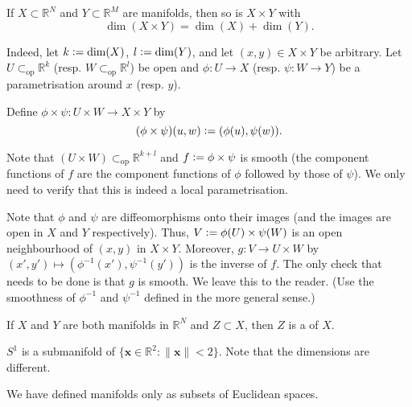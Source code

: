 \documentclass[12pt]{article}
\newcommand{\opsub}{\subset_{\operatorname{op}}}
\begin{document}
\begin{ex}
	If $X \subset \mathbb{R}^{N}$ and $Y \subset \mathbb{R}^{M}$ are manifolds, then so is $X \times Y$ with
	\begin{equation*} 
		\boxed{\dim(X \times Y) = \dim(X) + \dim(Y).}
	\end{equation*}

	Indeed, let $k \vcentcolon= \dim(X)$, $l \vcentcolon= \dim(Y)$, and let $(x, y) \in X \times Y$ be arbitrary. Let $U \opsub \mathbb{R}^{k}$ (resp. $W \opsub \mathbb{R}^{l}$) be open and $\phi : U \to X$ (resp. $\psi : W \to Y$) be a parametrisation around $x$ (resp. $y$). 

	Define $\phi \times \psi : U \times W \to X \times Y$ by
	\begin{equation*} 
		(\phi \times \psi)(u, w) \vcentcolon= (\phi(u), \psi(w)).
	\end{equation*}

	Note that $(U \times W) \opsub \mathbb{R}^{k + l}$ and $f \vcentcolon= \phi \times \psi$ is smooth (the component functions of $f$ are the component functions of $\phi$ followed by those of $\psi$). We only need to verify that this is indeed a local parametrisation.

	Note that $\phi$ and $\psi$ are diffeomorphisms onto their images (and the images are open in $X$ and $Y$ respectively). Thus, $V \vcentcolon= \phi(U) \times \psi(W)$ is an open neighbourhood of $(x, y)$ in $X \times Y$. Moreover, $g : V \to U \times W$ by $(x', y') \mapsto (\phi^{-1}(x'), \psi^{-1}(y'))$ is the inverse of $f$. \newline
	The only check that needs to be done is that $g$ is smooth. We leave this to the reader. (Use the smoothness of $\phi^{-1}$ and $\psi^{-1}$ defined in the more general sense.)
\end{ex}

\begin{defn}
	If $X$ and $Y$ are both manifolds in $\mathbb{R}^{N}$ and $Z \subset X$, then $Z$ is a  of $X$.
\end{defn}

\begin{ex}
	$S^{1}$ is a submanifold of $\{\mathbf{x} \in \mathbb{R}^{2} : \|\mathbf{x}\| < 2\}$. \newline
	Note that the dimensions are different.
\end{ex}

\begin{rem}
	We have defined manifolds only as subsets of Euclidean spaces.
\end{rem}
\end{document}
